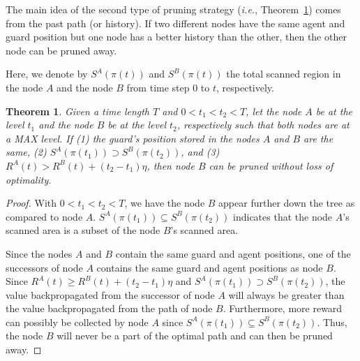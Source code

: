 \documentclass[10 pt, conference]{ieeeconf}
\newtheorem{theorem}{Theorem}
\newcommand{\ie}{\emph{i.e.}}
\begin{document}
The main idea of the second type of pruning strategy (\ie, Theorem~\ref{theorem:Compare_past}) comes from the past path (or history). If two different nodes have the same agent and guard position but one node has a better history than the other, then the other node can be pruned away.

Here, we denote by $S^A(\pi(t))$ and $S^B(\pi(t))$ the total scanned region in the node $A$ and the node $B$ from time step $0$ to $t$, respectively.

\begin{theorem}
Given a time length $T$ and $0<t_1<t_2<T$, let the node $A$ be at the level $t_1$ and the node $B$ be at the level $t_2$, respectively such that both nodes are at a MAX level. If (1) the guard's position stored in the nodes $A$ and $B$ are the same, (2) $S^A(\pi(t_1)) \supset S^B(\pi(t_2))$, and (3) $R^A(t) > R^B(t)+(t_2-t_1)\eta$, then node $B$ can be pruned without loss of optimality.
 \label{theorem:Compare_past}
\end{theorem}
\begin{proof}
With $0<t_1<t_2<T$, we have the node $B$ appear further down the tree as compared to node $A$. $S^A(\pi(t_1)) \subseteq S^B(\pi(t_2))$ indicates that the node $A$'s scanned area is a subset of the node $B$'s scanned area.

Since the nodes $A$ and $B$ contain the same guard and agent positions, one of the successors of node $A$ contains the same guard and agent positions as node $B$. Since $R^A(t) \geq R^B(t)+(t_2-t_1)\eta$ and $S^A(\pi(t_1)) \supset S^B(\pi(t_2))$, the value backpropagated from the successor of node $A$ will always be greater than the value backpropagated from the path of node $B$. Furthermore,  more reward can possibly be collected by node $A$ since $S^A(\pi(t_1)) \subseteq S^B(\pi(t_2))$. Thus, the node $B$ will never be a part of the optimal path and can then be pruned away. 
\end{proof}

\end{document}
